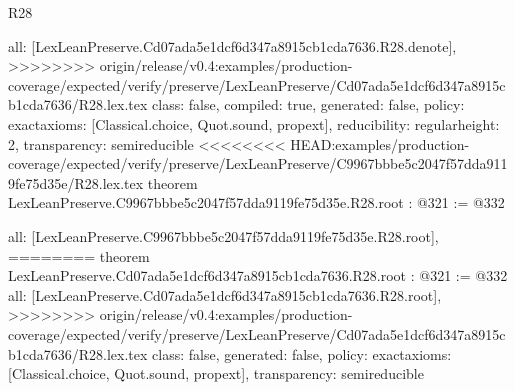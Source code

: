 \begin{lexlean}{R28}
\begin{coremodule}
{{{{{  all: [LexLeanPreserve.Cd07ada5e1dcf6d347a8915cb1cda7636.R28.denote],
>>>>>>>> origin/release/v0.4:examples/production-coverage/expected/verify/preserve/LexLeanPreserve/Cd07ada5e1dcf6d347a8915cb1cda7636/R28.lex.tex
  class: false,
  compiled: true,
  generated: false,
  policy: exact{axioms: [Classical.choice, Quot.sound, propext]},
  reducibility: regular{height: 2},
  transparency: semireducible
}
<<<<<<<< HEAD:examples/production-coverage/expected/verify/preserve/LexLeanPreserve/C9967bbbe5c2047f57dda9119fe75d35e/R28.lex.tex
theorem LexLeanPreserve.C9967bbbe5c2047f57dda9119fe75d35e.R28.root : @321 := @332 {
  all: [LexLeanPreserve.C9967bbbe5c2047f57dda9119fe75d35e.R28.root],
========
theorem LexLeanPreserve.Cd07ada5e1dcf6d347a8915cb1cda7636.R28.root : @321 := @332 {
  all: [LexLeanPreserve.Cd07ada5e1dcf6d347a8915cb1cda7636.R28.root],
>>>>>>>> origin/release/v0.4:examples/production-coverage/expected/verify/preserve/LexLeanPreserve/Cd07ada5e1dcf6d347a8915cb1cda7636/R28.lex.tex
  class: false,
  generated: false,
  policy: exact{axioms: [Classical.choice, Quot.sound, propext]},
  transparency: semireducible
}

}}}}}
\end{coremodule}
\end{lexlean}
